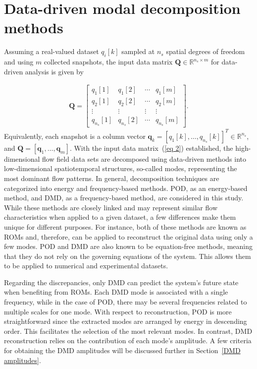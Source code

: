 \documentclass[a4paper,fleqn]{cas-sc}
\begin{document}
	\section{Data-driven modal decomposition methods}
	\label{Data-driven methods}
	
	Assuming a real-valued dataset $q_i[k]$ sampled at $n_s$ spatial degrees of freedom and using $m$ collected snapshots, the input data matrix $\mathbf{Q}\in \mathbb{R}^{n_s\times m}$ for data-driven analysis is given by
	
	\begin{align}
		\mathbf{Q} = \begin{bmatrix}
			q_{1}[1] & q_{1}[2] & \cdots & q_{1}[m] \\
			q_{2}[1] & q_{2}[2] & \cdots & q_{2}[m] \\
			\vdots & \vdots & \vdots & \vdots \\
			q_{n_s}[1] & q_{n_s}[2] & \cdots & q_{n_s}[m]
		\end{bmatrix}.\label{eq 2}
	\end{align}
	\noindent Equivalently, each snapshot is a column vector $\mathbf{q}_k=[q_1[k],\ldots,q_{n_s}[k]]^T\in\mathbb{R}^{n_s}$, and $\mathbf{Q}=[\mathbf{q}_1,\ldots,\mathbf{q}_m]$.
	\noindent With the input data matrix~(\ref{eq 2}) established, the high-dimensional flow field data sets are decomposed using data-driven methods into low-dimensional spatiotemporal structures, so-called modes, representing the most dominant flow patterns. In general, decomposition techniques are categorized into energy and frequency-based methods. POD, as an energy-based method, and DMD, as a frequency-based method, are considered in this study. While these methods are closely linked and may represent similar flow characteristics when applied to a given dataset, a few differences make them unique for different purposes. For instance, both of these methods are known as ROMs and, therefore, can be applied to reconstruct the original data using only a few modes. POD and DMD are also known to be equation-free methods, meaning that they do not rely on the governing equations of the system. This allows them to be applied to numerical and experimental datasets.
	
	Regarding the discrepancies, only DMD can predict the system's future state when benefiting from ROMs. Each DMD mode is associated with a single frequency, while in the case of POD, there may be several frequencies related to multiple scales for one mode. With respect to reconstruction, POD is more straightforward since the extracted modes are arranged by energy in descending order. This facilitates the selection of the most relevant modes. In contrast, DMD reconstruction relies on the contribution of each mode's amplitude. A few criteria for obtaining the DMD amplitudes will be discussed further in Section~\ref{DMD amplitudes}.  
	
\end{document}
